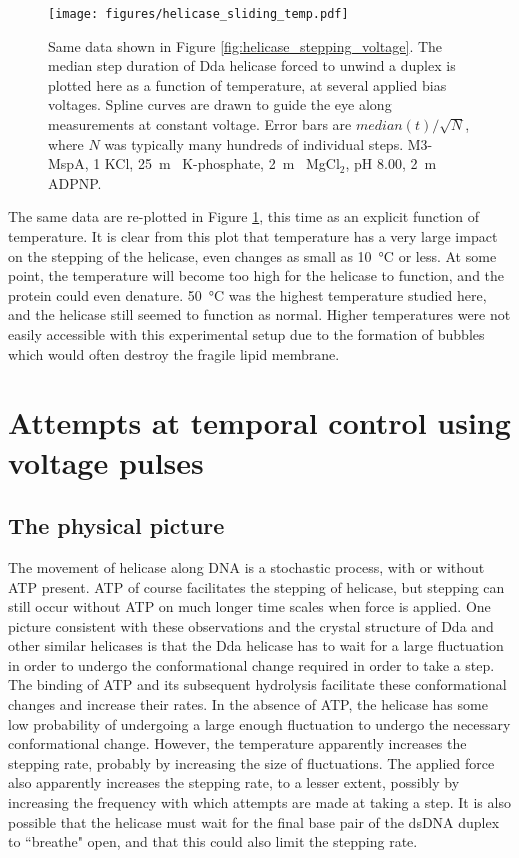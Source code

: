 \begin{figure}[h]
\begin{centering}
\texttt{[image: figures/helicase\_sliding\_temp.pdf]}
\caption[Forced helicase stepping depends on temperature]{Same data shown in Figure \ref{fig:helicase_stepping_voltage}.  The median step duration of Dda helicase forced to unwind a duplex is plotted here as a function of temperature, at several applied bias voltages.  Spline curves are drawn to guide the eye along measurements at constant voltage.  Error bars are $median(t)/\sqrt{N}$, where $N$ was typically many hundreds of individual steps.  M3-MspA, \SI{1}{\Molar} KCl, \SI{25}{\m\Molar} K-phosphate, \SI{2}{\m\Molar} MgCl$_2$, pH \num{8.00}, \SI{2}{\m\Molar} ADPNP.}
\label{fig:helicase_stepping_temp}
\end{centering}
\end{figure}

The same data are re-plotted in Figure \ref{fig:helicase_stepping_temp}, this time as an explicit function of temperature.  It is clear from this plot that temperature has a very large impact on the stepping of the helicase, even changes as small as \SI{10}{\celsius} or less.  At some point, the temperature will become too high for the helicase to function, and the protein could even denature.  \SI{50}{\celsius} was the highest temperature studied here, and the helicase still seemed to function as normal.  Higher temperatures were not easily accessible with this experimental setup due to the formation of bubbles which would often destroy the fragile lipid membrane.


\section{Attempts at temporal control using voltage pulses}

\subsection{The physical picture}

The movement of helicase along DNA is a stochastic process, with or without ATP present.  ATP of course facilitates the stepping of helicase, but stepping can still occur without ATP on much longer time scales when force is applied.  One picture consistent with these observations and the crystal structure of Dda and other similar helicases is that the Dda helicase has to wait for a large fluctuation in order to undergo the conformational change required in order to take a step.  The binding of ATP and its subsequent hydrolysis facilitate these conformational changes and increase their rates.  In the absence of ATP, the helicase has some low probability of undergoing a large enough fluctuation to undergo the necessary conformational change.  However, the temperature apparently increases the stepping rate, probably by increasing the size of fluctuations.  The applied force also apparently increases the stepping rate, to a lesser extent, possibly by increasing the frequency with which attempts are made at taking a step.  It is also possible that the helicase must wait for the final base pair of the dsDNA duplex to ``breathe" open, and that this could also limit the stepping rate.

